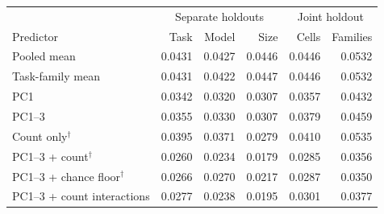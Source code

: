 \begin{tabular}{lrrrrr}
\toprule
& \multicolumn{3}{c}{Separate holdouts} & \multicolumn{2}{c}{Joint holdout}\\
Predictor & Task & Model & Size & Cells & Families\\
\midrule
Pooled mean & 0.0431 & 0.0427 & 0.0446 & 0.0446 & 0.0532\\
Task-family mean & 0.0431 & 0.0422 & 0.0447 & 0.0446 & 0.0532\\
PC1 & 0.0342 & 0.0320 & 0.0307 & 0.0357 & 0.0432\\
PC1--3 & 0.0355 & 0.0330 & 0.0307 & 0.0379 & 0.0459\\
Count only$^\dagger$ & 0.0395 & 0.0371 & 0.0279 & 0.0410 & 0.0535\\
PC1--3 + count$^\dagger$ & 0.0260 & 0.0234 & 0.0179 & 0.0285 & 0.0356\\
PC1--3 + chance floor$^\dagger$ & 0.0266 & 0.0270 & 0.0217 & 0.0287 & 0.0350\\
PC1--3 + count interactions & 0.0277 & 0.0238 & 0.0195 & 0.0301 & 0.0377\\
\bottomrule
\end{tabular}

